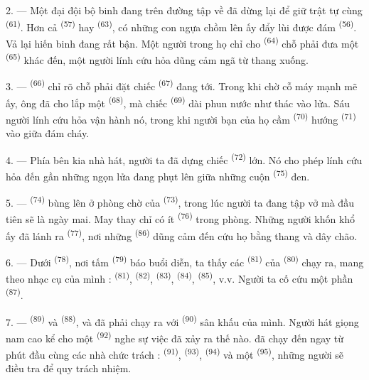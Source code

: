 2. --- Một đại đội bộ binh đang trên đường tập về đã dừng lại để giữ trật tự cùng
 \textsuperscript{(61)}. Hơn cả 
\textsuperscript{(57)} hay  \textsuperscript{(63)},
 có những con ngựa chồm lên ấy đẩy lùi được đám  \textsuperscript{(56)}. Vả lại hiến binh đang rất bận. Một người trong họ chỉ cho
 \textsuperscript{(64)} chỗ phải đưa một 
\textsuperscript{(65)} khác đến, một người lính cứu hỏa dũng cảm ngã từ thang xuống.

3. ---  \textsuperscript{(66)} chỉ rõ chỗ phải đặt chiếc  \textsuperscript{(67)} đang tới. Trong khi chờ cỗ máy mạnh mẽ ấy, ông đã
cho lắp một  \textsuperscript{(68)}, mà chiếc 
\textsuperscript{(69)} dài phun nước như thác vào lửa. Sáu người lính cứu hỏa vận hành
nó, trong khi người bạn của họ cầm  \textsuperscript{(70)} hướng
 \textsuperscript{(71)} vào giữa đám cháy.

4. --- Phía bên kia nhà hát, người ta đã dựng chiếc 
\textsuperscript{(72)} lớn. Nó cho phép lính cứu hỏa đến gần những ngọn lửa đang phụt lên
giữa những cuộn  \textsuperscript{(75)} đen.

\VUsaut{5.0mm}
\VUsaut{3.4mm}

5. ---  \textsuperscript{(74)} bùng lên ở phòng chờ của 
\textsuperscript{(73)}, trong lúc người ta đang tập vở  mà
 đầu tiên sẽ là ngày mai. May thay chỉ có ít 
\textsuperscript{(76)} trong phòng. Những người khốn khổ ấy đã lánh ra 
\textsuperscript{(77)}, nơi những  \textsuperscript{(86)} dũng cảm
đến cứu họ bằng thang và dây chão.

6. --- Dưới  \textsuperscript{(78)}, nơi tấm 
\textsuperscript{(79)} báo buổi diễn, ta thấy các 
\textsuperscript{(81)} của  \textsuperscript{(80)} chạy ra, mang theo
nhạc cụ của mình :  \textsuperscript{(81)}, 
\textsuperscript{(82)},  \textsuperscript{(83)},  \textsuperscript{(84)},  \textsuperscript{(85)}, v.v. Người ta cố
cứu một phần  \textsuperscript{(87)}.

7. ---  \textsuperscript{(89)} và 
\textsuperscript{(88)},  và  đã phải chạy ra với
 \textsuperscript{(90)} sân khấu của mình. Người hát giọng nam cao kể
cho một  \textsuperscript{(92)} nghe sự việc đã xảy ra thế nào.
 đã chạy đến ngay từ phút đầu cùng các nhà chức trách :  \textsuperscript{(91)},  \textsuperscript{(93)},  \textsuperscript{(94)} và một  \textsuperscript{(95)}, những
người sẽ điều tra để quy trách nhiệm.
\VUsaut{6.0mm}
\VUfilet{22mm}
